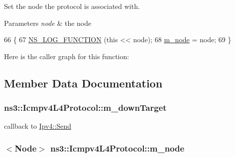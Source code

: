 Set the node the protocol is associated with. 


\begin{DoxyParams}{Parameters}
{\em node} & the node \\
\hline
\end{DoxyParams}

\begin{DoxyCode}
66 \{
67   \hyperlink{log-macros-disabled_8h_a90b90d5bad1f39cb1b64923ea94c0761}{NS\_LOG\_FUNCTION} (\textcolor{keyword}{this} << node);
68   \hyperlink{classns3_1_1Icmpv4L4Protocol_a1130d657dedac6e13bf2ee791ee4f864}{m\_node} = node;
69 \}
\end{DoxyCode}


Here is the caller graph for this function\+:




\subsection{Member Data Documentation}
\subsubsection[{\texorpdfstring{m\+\_\+down\+Target}{m_downTarget}}]{ ns3\+::\+Icmpv4\+L4\+Protocol\+::m\+\_\+down\+Target\hspace{0.3cm}{\ttfamily [private]}}\hypertarget{classns3_1_1Icmpv4L4Protocol_ad8cfe6cd2b2faddc9129845c99527de2}{}\label{classns3_1_1Icmpv4L4Protocol_ad8cfe6cd2b2faddc9129845c99527de2}


callback to \hyperlink{classns3_1_1Ipv4_a81f6cbb774cdc255e3e49490e0960539}{Ipv4\+::\+Send} 

\subsubsection[{\texorpdfstring{m\+\_\+node}{m_node}}]{$<${\bf Node}$>$ ns3\+::\+Icmpv4\+L4\+Protocol\+::m\+\_\+node\hspace{0.3cm}{\ttfamily [private]}}\hypertarget{classns3_1_1Icmpv4L4Protocol_a1130d657dedac6e13bf2ee791ee4f864}{}\label{classns3_1_1Icmpv4L4Protocol_a1130d657dedac6e13bf2ee791ee4f864}


